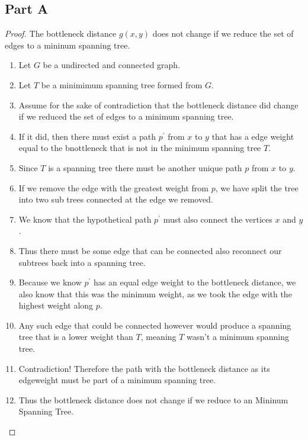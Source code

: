 \documentclass{article}
\begin{document}
\subsection{Part A}
\begin{proof} The bottleneck
      distance \(g(x,y)\) does not change if we reduce the set of edges to a mininum spanning
      tree.
      \begin{enumerate}
            \item Let \(G\) be a undirected and connected graph.
            \item Let \(T\) be a minimimum spanning tree formed from \(G\).
            \item Assume for the sake of contradiction that the bottleneck distance did
                  change if we reduced the set of edges to a minimum spanning tree.
            \item If it did, then there must exist a path \(p^\prime \) from \(x\) to
                  \(y\) that has a edge weight equal to the bnottleneck that is not in the
                  minimum spanning tree \(T\).
            \item Since \(T\) is a spanning tree there must be another unique path \(p\) from \(x\) to \(y\).
            \item If we remove the edge with the greatest weight from \(p\), we have split
                  the tree into two sub trees connected at the edge we removed.
            \item We know that the hypothetical path \(p^\prime \) must also connect the
                  vertices \(x\) and \(y\).
            \item Thus there must be some edge that can be connected also reconnect
                  our subtrees back into a spanning tree.\item Because we know
                  \(p^\prime \) has an equal edge weight to the bottleneck distance, we
                  also know that this was the minimum weight, as we took the edge with the
                  highest weight along \(p\).
            \item Any such edge that could be connected however would produce a spanning
                  tree that is a lower weight than \(T\), meaning \(T\) wasn't a minimum
                  spanning tree.
            \item Contradiction! Therefore the path with the bottleneck distance as its
                  edgeweight must be part of a minimum spanning tree.
            \item Thus the bottleneck distance does not change if we reduce to an Mininum
                  Spanning Tree.
      \end{enumerate}
\end{proof}
\end{document}
